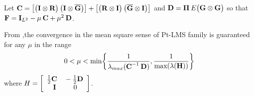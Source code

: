 \documentclass[journal, one column]{IEEEtran}
\begin{document}
Let $\textbf{C}=\big[\big(\textbf{I} \otimes \textbf{R} \big) \hspace{0.2em} \big(\textbf{I} \otimes \overline{\textbf{G}} \big)\big] + \big[ \big( \textbf{R} \otimes \textbf{I} \big) \hspace{0.2em} \big( \overline{\textbf{G}} \otimes \textbf{I} \big) \big]$ and $\textbf{D}= \boldsymbol{\Pi} \hspace{0.2em} E\big(\textbf{G} \otimes \textbf{G} \big)$ so that $\textbf{F}= \textbf{I}_{L^{2}}- \mu \hspace{0.2em} \textbf{C} +\mu^{2} \hspace{0.2em} \textbf{D}$.
\par
From \cite{10},the convergence in the mean square sense of Pt-LMS family is guaranteed for any $\mu$ in the range
\begin{equation}\label{eq2.17}
\begin{split}
0 < \mu < \text{min}\bigg\{ \frac{1}{\lambda_{max}(\textbf{C}^{-1} \hspace{0.2em}\textbf{D})}, \frac{1}{\text{max}(\lambda(\textbf{H}))} \bigg\}
\end{split}
\end{equation}
where $H=\left[ \begin{array}{c} \frac{1}{2} \textbf{C}  \hspace{1em} -\frac{1}{2} \textbf{D}\\ \textbf{I} \hspace{2.5em} 0 \end{array} \right]$.
\end{document}
